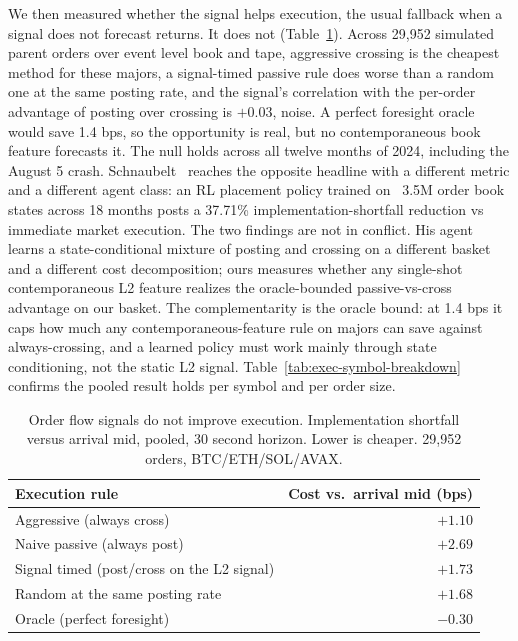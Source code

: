 \documentclass[11pt]{article}
\begin{document}
We then measured whether the signal helps execution, the usual fallback when a signal does not
forecast returns. It does not (Table~\ref{tab:exec}). Across 29{,}952 simulated parent orders
over event level book and tape, aggressive crossing is the cheapest method for these majors, a
signal-timed passive rule does worse than a random one at the same posting rate, and the signal's
correlation with the per-order advantage of posting over crossing is $+0.03$, noise. A
perfect foresight oracle would save 1.4 bps, so the opportunity is real, but no contemporaneous book
feature forecasts it. The null holds across all twelve months of 2024, including the August 5
crash. Schnaubelt~\cite{schnaubelt2022rl} reaches the opposite headline with a different
metric and a different agent class: an RL placement policy trained on ~3.5M order book
states across 18 months posts a 37.71\% implementation-shortfall reduction vs immediate
market execution. The two findings are not in conflict. His agent learns a state-conditional
mixture of posting and crossing on a different basket and a different cost decomposition;
ours measures whether any single-shot contemporaneous L2 feature realizes the
oracle-bounded passive-vs-cross advantage on our basket. The complementarity is the
oracle bound: at 1.4 bps it caps how much any contemporaneous-feature rule on majors can
save against always-crossing, and a learned policy must work mainly through state
conditioning, not the static L2 signal. Table~\ref{tab:exec-symbol-breakdown} confirms the pooled result holds per symbol and per
order size.

\begin{table}[h]
\centering
\caption{Order flow signals do not improve execution. Implementation shortfall versus arrival
mid, pooled, 30 second horizon. Lower is cheaper. 29{,}952 orders, BTC/ETH/SOL/AVAX.}
\label{tab:exec}
\begin{tabular}{lr}
\toprule
Execution rule & Cost vs.\ arrival mid (bps) \\
\midrule
Aggressive (always cross) & $+1.10$ \\
Naive passive (always post) & $+2.69$ \\
Signal timed (post/cross on the L2 signal) & $+1.73$ \\
Random at the same posting rate & $+1.68$ \\
Oracle (perfect foresight) & $-0.30$ \\
\bottomrule
\end{tabular}
\end{table}
\end{document}
